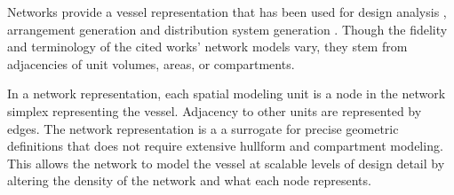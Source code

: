 \documentclass[preprint,12pt]{elsarticle}
\begin{document}
\noindent Networks provide a vessel representation that has been used for design analysis \citep{Gillespie2012,Gillespie2013,Rigterink2014,Dellsy2015}, arrangement generation \citep{VanOers2011,VanOers2012} and distribution system generation \citep{Fiedel2011}. Though the fidelity and terminology of the cited works' network models vary, they stem from adjacencies of unit volumes, areas, or compartments. 

In a network representation, each spatial modeling unit is a node in the network simplex representing the vessel. Adjacency to other units are represented by edges. The network representation is a a surrogate for precise geometric definitions that does not require extensive hullform and compartment modeling. This allows the network to model the vessel at scalable levels of design detail by altering the density of the network and what each node represents.

%	

%	
\end{document}
